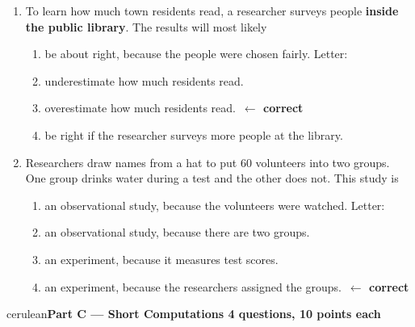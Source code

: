\documentclass[10pt]{article}
\makeatletter
\newcommand{\parthead}[1]{%
  \vspace{6pt}\noindent
  {\tcbset{after={\par\nopagebreak}}%
   \begin{headlinebox}{cerulean}{\color{white}\bfseries #1}\end{headlinebox}}%
  \nopagebreak\vspace{4pt}}
\newcommand{\correct}{\ifsaar@workvisible\ \textcolor{keyred}{\textbf{$\leftarrow$ correct}}\fi}
\makeatother
\begin{document}
\begin{enumerate}[leftmargin=2.2em, itemsep=5pt, topsep=2pt, start=11]
\boxguard[7]
\item To learn how much town residents read, a researcher surveys people
\textbf{inside the public library}. The results will most likely
\begin{enumerate}[label=(\Alph*), leftmargin=1.8em, itemsep=1pt, topsep=1pt]
  \item be about right, because the people were chosen fairly.
\hfill Letter:~\gradedblank[id=q14, type=choice, points=4, answer={C}]{0.45in}{10pt}  \item underestimate how much residents read.
  \item overestimate how much residents read.\correct
  \item be right if the researcher surveys more people at the library.
\end{enumerate}

\boxguard[7]
\item Researchers draw names from a hat to put $60$ volunteers into two groups. One
group drinks water during a test and the other does not. This study is
\begin{enumerate}[label=(\Alph*), leftmargin=1.8em, itemsep=1pt, topsep=1pt]
  \item an observational study, because the volunteers were watched.
\hfill Letter:~\gradedblank[id=q15, type=choice, points=4, answer={D}]{0.45in}{10pt}  \item an observational study, because there are two groups.
  \item an experiment, because it measures test scores.
  \item an experiment, because the researchers assigned the groups.\correct
\end{enumerate}

\end{enumerate}
\normalsize

\boxguard[12]
\parthead{Part C --- Short Computations \hfill 4 questions, 10 points each}
\end{document}

